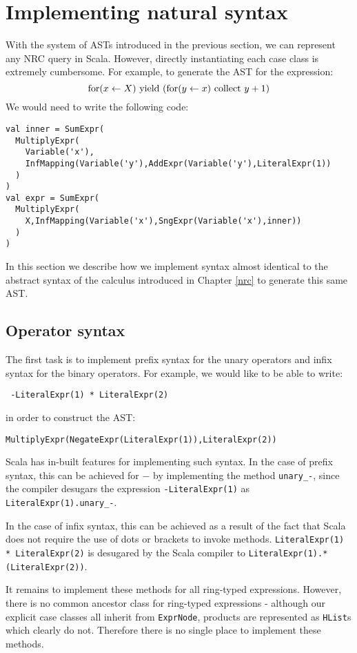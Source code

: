 \section{Implementing natural syntax}
With the system of ASTs introduced in the previous section, we can represent any NRC query in Scala. However, directly instantiating each case class is extremely cumbersome. For example, to generate the AST for the expression: 
\begin{equation*}
\textrm{for}(x \leftarrow X) \textrm{ yield } (\textrm{for}(y \leftarrow x) \textrm{ collect } y+1)
\end{equation*}
We would need to write the following code:
\vs\begin{lstlisting}
val inner = SumExpr(
  MultiplyExpr(
    Variable('x'),
    InfMapping(Variable('y'),AddExpr(Variable('y'),LiteralExpr(1))
  )
)
val expr = SumExpr(
  MultiplyExpr(
    X,InfMapping(Variable('x'),SngExpr(Variable('x'),inner))
  )
)
\end{lstlisting}\vs
In this section we describe how we implement syntax almost identical to the abstract syntax of the calculus introduced in Chapter \ref{nrc} to generate this same AST.

\subsection{Operator syntax}
The first task is to implement prefix syntax for the unary operators and infix syntax for the binary operators. For example, we would like to be able to write:
\vs
\begin{lstlisting}
 -LiteralExpr(1) * LiteralExpr(2)
\end{lstlisting}
\vs
in order to construct the AST:
\vs
\begin{lstlisting}
MultiplyExpr(NegateExpr(LiteralExpr(1)),LiteralExpr(2))
\end{lstlisting}
\vs

Scala has in-built features for implementing such syntax. In the case of prefix syntax, this can be achieved for $-$ by implementing the method \lstinline{unary_-}, since the compiler desugars the expression \lstinline{-LiteralExpr(1)} as \lstinline{LiteralExpr(1).unary_-}.

In the case of infix syntax, this can be achieved as a result of the fact that Scala does not require the use of dots or brackets to invoke methods.  \lstinline{LiteralExpr(1) * LiteralExpr(2)} is desugared by the Scala compiler to \lstinline{LiteralExpr(1).*(LiteralExpr(2))}.

It remains to implement these methods for all ring-typed expressions. However, there is no common ancestor class for ring-typed expressions - although our explicit case classes all inherit from \lstinline{ExprNode}, products are represented as \lstinline{HList}s which clearly do not. Therefore there is no single place to implement these methods.


